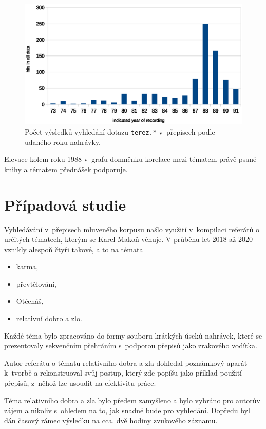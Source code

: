 \begin{figure}[htpb]
\includegraphics[scale=0.9]{rc/teresa-by-year.eps}
\caption{Počet výsledků vyhledání dotazu \texttt{terez.*} v~přepisech podle
udaného roku nahrávky.}
\label{fig:teresa-year}
\end{figure}

Elevace kolem roku 1988 v~grafu domněnku korelace mezi tématem právě psané knihy
a tématem přednášek podporuje.



\section{Případová studie}

Vyhledávání v~přepisech mluveného korpusu našlo využití v~kompilaci referátů o
určitých tématech, kterým se Karel Makoň věnuje. V průběhu let 2018 až 2020
vznikly alespoň čtyři takové, a to na témata
\begin{itemize}
\item{karma,}
\item{převtělování,}
\item{Otčenáš,}
\item{relativní dobro a zlo.}
\end{itemize}
Každé téma bylo zpracováno do formy souboru krátkých úseků nahrávek, které se
prezentovaly sekvenčním přehráním s~podporou přepisů jako zrakového vodítka.

Autor referátu o tématu relativního dobra a zla dohledal poznámkový aparát
k~tvorbě a rekonstruoval svůj postup, který zde popíšu jako příklad použití
přepisů, z~něhož lze usoudit na efektivitu práce.

Téma relativního dobra a zla bylo předem zamyšleno a bylo vybráno pro autorův
zájem a nikoliv s~ohledem na to, jak snadné bude pro vyhledání. Dopředu byl dán
časový rámec výsledku na cca. dvě hodiny zvukového záznamu.

